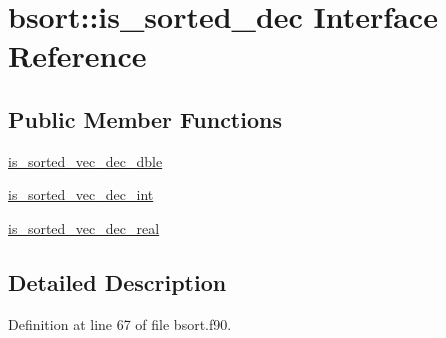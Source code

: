 \hypertarget{interfacebsort_1_1is__sorted__dec}{\section{bsort\-:\-:is\-\_\-sorted\-\_\-dec Interface Reference}
\label{interfacebsort_1_1is__sorted__dec}
}
\subsection*{Public Member Functions}
\begin{DoxyCompactItemize}
\item 
\hyperlink{interfacebsort_1_1is__sorted__dec_a0b0f7cb72bf6b23f10f63dc856253ad0_a0b0f7cb72bf6b23f10f63dc856253ad0}{is\-\_\-sorted\-\_\-vec\-\_\-dec\-\_\-dble}
\item 
\hyperlink{interfacebsort_1_1is__sorted__dec_a460bf611a84f6e5df57eab2c8ad95278_a460bf611a84f6e5df57eab2c8ad95278}{is\-\_\-sorted\-\_\-vec\-\_\-dec\-\_\-int}
\item 
\hyperlink{interfacebsort_1_1is__sorted__dec_ac1ec5f4a6f81fa34107bafa68e116035_ac1ec5f4a6f81fa34107bafa68e116035}{is\-\_\-sorted\-\_\-vec\-\_\-dec\-\_\-real}
\end{DoxyCompactItemize}


\subsection{Detailed Description}


Definition at line 67 of file bsort.\-f90.



